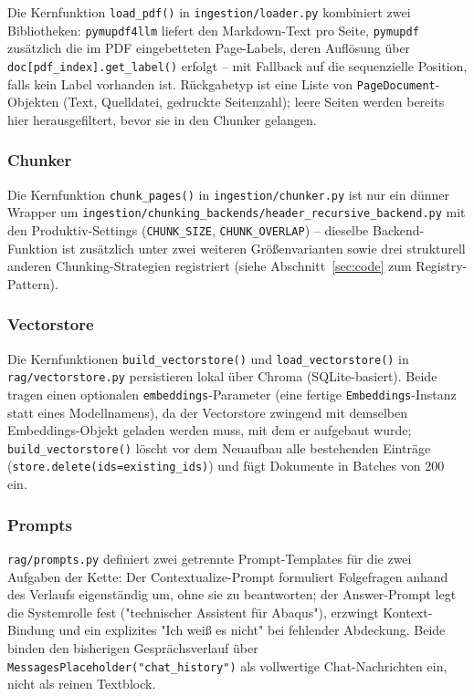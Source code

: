 \documentclass[11pt,a4paper]{article}
\begin{document}
Die Kernfunktion \texttt{load\_pdf()} in \texttt{ingestion/loader.py}
kombiniert zwei Bibliotheken: \texttt{pymupdf4llm} liefert den
Markdown-Text pro Seite, \texttt{pymupdf} zusätzlich die im PDF
eingebetteten Page-Labels, deren Auflösung über
\texttt{doc[pdf\_index].get\_label()} erfolgt -- mit Fallback auf die
sequenzielle Position, falls kein Label vorhanden ist. Rückgabetyp ist
eine Liste von \texttt{PageDocument}-Objekten (Text, Quelldatei, gedruckte
Seitenzahl); leere Seiten werden bereits hier herausgefiltert, bevor sie
in den Chunker gelangen.

\subsubsection{Chunker}

Die Kernfunktion \texttt{chunk\_pages()} in \texttt{ingestion/chunker.py}
ist nur ein dünner Wrapper um
\texttt{ingestion/chunking\_backends/header\_recursive\_backend.py} mit
den Produktiv-Settings (\texttt{CHUNK\_SIZE}, \texttt{CHUNK\_OVERLAP}) --
dieselbe Backend-Funktion ist zusätzlich unter zwei weiteren
Größenvarianten sowie drei strukturell anderen Chunking-Strategien
registriert (siehe Abschnitt~\ref{sec:code} zum Registry-Pattern).

\subsubsection{Vectorstore}

Die Kernfunktionen \texttt{build\_vectorstore()} und
\texttt{load\_vectorstore()} in \texttt{rag/vectorstore.py} persistieren
lokal über Chroma (SQLite-basiert). Beide tragen einen optionalen
\texttt{embeddings}-Parameter (eine fertige \texttt{Embeddings}-Instanz
statt eines Modellnamens), da der Vectorstore zwingend mit demselben
Embeddings-Objekt geladen werden muss, mit dem er aufgebaut wurde;
\texttt{build\_vectorstore()} löscht vor dem Neuaufbau alle bestehenden
Einträge (\texttt{store.delete(ids=existing\_ids)}) und fügt Dokumente in
Batches von 200 ein.

\subsubsection{Prompts}

\texttt{rag/prompts.py} definiert zwei getrennte Prompt-Templates für die
zwei Aufgaben der Kette: Der Contextualize-Prompt formuliert Folgefragen
anhand des Verlaufs eigenständig um, ohne sie zu beantworten; der
Answer-Prompt legt die Systemrolle fest ("technischer Assistent für
Abaqus"), erzwingt Kontext-Bindung und ein explizites "Ich weiß es nicht"
bei fehlender Abdeckung. Beide binden den bisherigen Gesprächsverlauf über
\texttt{MessagesPlaceholder("chat\_history")} als vollwertige
Chat-Nachrichten ein, nicht als reinen Textblock.
\end{document}
